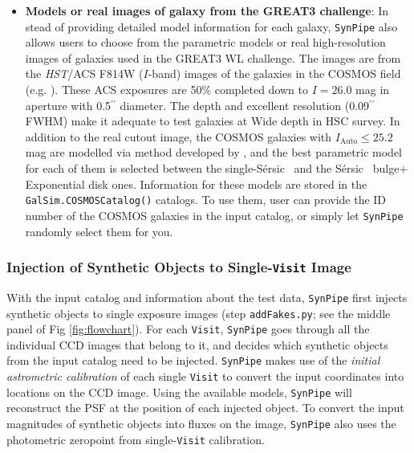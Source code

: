 \documentclass[useamsfonts]{pasj01}
\def\asec{$^{\prime\prime}$}
\def\ser{{S\'{e}rsic\ }}
\def\synpipe{\texttt{SynPipe}}
\def\visit{\texttt{Visit}}
\def\hst{{\textit{HST}}}
\begin{document}
\begin{itemize}
        \item \textbf{Models or real images of galaxy from the GREAT3 challenge}:
            In stead of providing detailed model information for each galaxy, \synpipe{}
            also allows users to choose from the parametric models or real
            high-resolution images of galaxies used in the GREAT3 WL challenge.
            The images are from the \hst{}/ACS F814W ($I$-band) images of the galaxies
            in the COSMOS field (e.g. \citealt{Scoville2007}).
            These ACS exposures are 50\% completed down to $I=26.0$ mag in aperture with
            0.5\asec{} diameter.
            The depth and excellent resolution (0.09\asec FWHM) make it adequate to test
            galaxies at Wide depth in HSC survey.
            In addition to the real cutout image, the COSMOS galaxies with
            $I_{\mathrm{Auto}}\leq25.2$ mag are modelled via method developed by
            \citet{Lackner2012}, and the best parametric model for each of them is
            selected between the single-\ser{} and the \ser{} bulge$+$Exponential disk
            ones.
            Information for these models are stored in the
            \texttt{GalSim.COSMOSCatalog()} catalogs.
            To use them, user can provide the ID number of the COSMOS galaxies in the
            input catalog, or simply let \synpipe{} randomly select them for you.

    \end{itemize}

\subsubsection{Injection of Synthetic Objects to Single-\visit{} Image}
    \label{sssec:addFakes}

    With the input catalog and information about the test data, \synpipe{} first
    injects synthetic objects to single exposure images (step \texttt{addFakes.py};
    see the middle panel of Fig \ref{fig:flowchart}).
    For each \visit{}, \synpipe{} goes through all the individual CCD images
    that belong to it, and decides which synthetic objects from the input catalog need
    to be injected.
    \synpipe{} makes use of the \textit{initial astrometric calibration} of each single
    \visit{} to convert the input coordinates into locations on the CCD image.
    Using the available models, \synpipe{} will reconstruct the PSF at the position of
    each injected object.
    To convert the input magnitudes of synthetic objects into fluxes on the image,
    \synpipe{} also uses the photometric zeropoint from single-\visit{}
    calibration.
\end{document}
